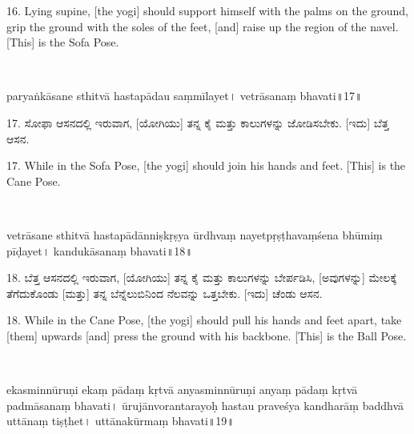 \begin{eng}
16. Lying supine, [the yogi] should support himself with the palms on the ground, grip the ground with the soles of the feet, [and] raise up the region of the navel. [This] is the Sofa Pose.
\end{eng}
\newpage

~\vskip 1cm

\dummyimage
\begin{sans}
paryaṅkāsane sthitvā hastapādau saṃmīlayet\endnote{saṃmīlayet~] P, saṃmīlya M.}। vetrāsanaṃ bhavati॥17॥
\end{sans}
\bigskip

\begin{kan}
17.	ಸೋಫಾ ಆಸನದಲ್ಲಿ ಇರುವಾಗ, [ಯೋಗಿಯು] ತನ್ನ ಕೈ ಮತ್ತು ಕಾಲುಗಳನ್ನು ಜೋಡಿಸಬೇಕು. [ಇದು] ಬೆತ್ತ ಆಸನ.
\end{kan}
\bigskip

\begin{eng}
17. While in the Sofa Pose, [the yogi] should join his hands and feet. [This] is the Cane Pose.
\end{eng}
\newpage

~\vskip 1cm

\dummyimage
\begin{sans}
vetrāsane sthitvā hastapādānniṣkṛṣya\endnote{niṣkṛṣya~] \textit{emend.}, niṣkṛṣyam M.} ūrdhvaṃ nayetpṛṣṭhavaṃśena bhūmiṃ pīḍayet\endnote{pīḍayet~] \textit{conj.}, pothayet M.}। kandukāsanaṃ bhavati॥18॥
\end{sans}
\bigskip

\begin{kan}
18.	ಬೆತ್ತ ಆಸನದಲ್ಲಿ ಇರುವಾಗ, [ಯೋಗಿಯು] ತನ್ನ ಕೈ ಮತ್ತು ಕಾಲುಗಳನ್ನು ಬೇರ್ಪಡಿಸಿ, [ಅವುಗಳನ್ನು] ಮೇಲಕ್ಕೆ ತೆಗೆದುಕೊಂಡು [ಮತ್ತು] ತನ್ನ ಬೆನ್ನೆಲುಬಿನಿಂದ ನೆಲವನ್ನು ಒತ್ತಬೇಕು. [ಇದು] ಚೆಂಡು ಆಸನ.
\end{kan}
\bigskip

\begin{eng}
18. While in the Cane Pose, [the yogi] should pull his hands and feet apart, take [them] upwards [and] press the ground with his backbone. [This] is the Ball Pose.
\end{eng}
\newpage

~\vskip 1cm

\dummyimage
\begin{sans}
ekasminnūruṇi ekaṃ pādaṃ kṛtvā anyasminnūruṇi anyaṃ pādaṃ kṛtvā padmāsanaṃ bhavati। ūrujānvorantarayoḥ\endnote{antarayoḥ~] P, aṃtayoḥ M.} hastau praveśya\endnote{praveśya~]  \textit{emend.}, praviśya M.} kandharāṃ baddhvā uttānaṃ tiṣṭhet। uttānakūrmaṃ bhavati॥19॥
\end{sans}
\bigskip

